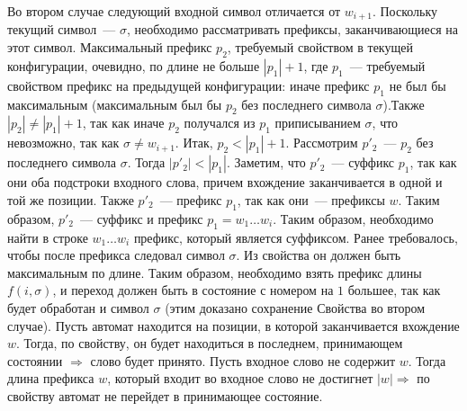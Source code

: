\documentclass[a4paper]{article}
\begin{document}
Во втором случае следующий входной символ отличается от $w_{i+1}$. Поскольку текущий символ~--- $\sigma$, необходимо рассматривать префиксы, заканчивающиеся на этот символ. Максимальный префикс $p_2$, требуемый свойством в текущей конфигурации, очевидно, по длине не больше $|p_1|+1$, где $p_1$~--- требуемый свойством префикс на предыдущей конфигурации: иначе префикс $p_1$ не был бы максимальным (максимальным был бы $p_2$ без последнего символа $\sigma$).\newline Также $|p_2|\neq|p_1|+1$, так как иначе $p_2$ получался из $p_1$ приписыванием $\sigma$, что невозможно, так как $\sigma\neq w_{i+1}$. Итак, $p_2<|p_1|+1$. Рассмотрим $p'_2$~--- $p_2$ без последнего символа $\sigma$. Тогда $|p'_2|<|p_1|$.\newline
Заметим, что $p'_2$~--- суффикс $p_1$, так как они оба подстроки входного слова, причем вхождение заканчивается в одной и той же позиции. Также $p'_2$~--- префикс $p_1$, так как они~--- префиксы $w$. Таким образом, $p'_2$~--- суффикс и префикс $p_1=w_1\dots w_i$. Таким образом, необходимо найти в строке $w_1\dots w_i$ префикс, который является суффиксом. Ранее требовалось, чтобы после префикса следовал символ $\sigma$. Из свойства он должен быть максимальным по длине. Таким образом, необходимо взять префикс длины $f(i,\sigma)$, и переход должен быть в состояние с номером на $1$ большее, так как будет обработан и символ $\sigma$ (этим доказано сохранение Свойства во втором случае).\newline
Пусть автомат находится на позиции, в которой заканчивается вхождение $w$. Тогда, по свойству, он будет находиться в последнем, принимающем состоянии $\Rightarrow$ слово будет принято.\newline
Пусть входное слово не содержит $w$. Тогда длина префикса $w$, который входит во входное слово не достигнет $|w|\Rightarrow$ по свойству автомат не перейдет в принимающее состояние.
\end{document}
